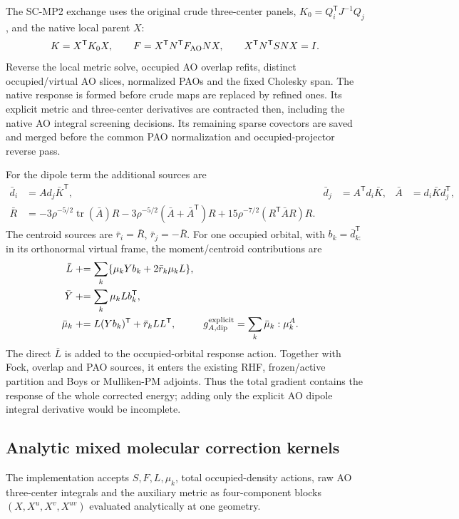 \documentclass[11pt]{article}
\begin{document}
The SC-MP2 exchange uses the original crude three-center panels,
$K_0=Q_i^{\mathsf T}J^{-1}Q_j$, and the native local parent $X$:
\begin{equation}
 K=X^{\mathsf T}K_0X,\qquad
 F=X^{\mathsf T}N^{\mathsf T}F_{\rm AO}NX,\qquad
 X^{\mathsf T}N^{\mathsf T}SNX=I.
\end{equation}
Reverse the local metric solve, occupied AO overlap refits, distinct
occupied/virtual AO slices, normalized PAOs and the fixed Cholesky span.
The native response is formed before crude maps are replaced by refined
ones. Its explicit metric and three-center derivatives are contracted then,
including the native AO integral screening decisions. Its remaining sparse
covectors are saved and merged before the common PAO normalization and
occupied-projector reverse pass.

For the dipole term the additional sources are
\begin{align}
 \bar d_i&=A d_j\bar K^{\mathsf T},&
 \bar d_j&=A^{\mathsf T}d_i\bar K, &
 \bar A&=d_i\bar K d_j^{\mathsf T},\\
 \bar R&=-3\rho^{-5/2}\operatorname{tr}(\bar A)R
 -3\rho^{-5/2}(\bar A+\bar A^{\mathsf T})R
 +15\rho^{-7/2}(R^{\mathsf T}\bar A R)R.&&&
 \label{eq:dipole-centroid-bar}
\end{align}
The centroid sources are $\bar r_i=\bar R$, $\bar r_j=-\bar R$.
For one occupied orbital, with $b_k=\bar d_{k:}^{\mathsf T}$ in its
orthonormal virtual frame, the moment/centroid contributions are
\begin{align}
 \bar L&\mathrel{+}=\sum_k\{\mu_kYb_k+2\bar r_k\mu_kL\},\\
 \bar Y&\mathrel{+}=\sum_k\mu_kL b_k^{\mathsf T},\\
 \bar\mu_k&\mathrel{+}=L(Yb_k)^{\mathsf T}+\bar r_kLL^{\mathsf T},&
 g^{\rm explicit}_{A,\rm dip}&=\sum_k\bar\mu_k:\mu_k^A.
\end{align}
The direct $\bar L$ is added to the occupied-orbital response action.
Together with Fock, overlap and PAO sources, it enters the existing RHF,
frozen/active partition and Boys or Mulliken-PM adjoints. Thus the total
gradient contains the response of the whole corrected energy; adding only
the explicit AO dipole integral derivative would be incomplete.

\subsection{Analytic mixed molecular correction kernels}
The implementation accepts $S,F,L,\mu_k$, total occupied-density actions,
raw AO three-center integrals and the auxiliary metric as four-component
blocks $(X,X^u,X^v,X^{uv})$ evaluated analytically at one geometry.
\end{document}
